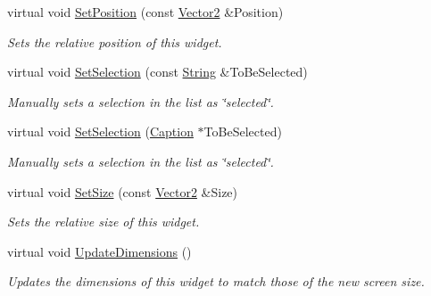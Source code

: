 \begin{DoxyCompactItemize}
virtual void \hyperlink{classMezzanine_1_1UI_1_1DropDownList_a480682783cfaf4ea18b90a058c958ea7}{SetPosition} (const \hyperlink{classMezzanine_1_1Vector2}{Vector2} \&Position)
\begin{DoxyCompactList}\small\item\em Sets the relative position of this widget. \item\end{DoxyCompactList}\item 
virtual void \hyperlink{classMezzanine_1_1UI_1_1DropDownList_ae65a61e7a199b75b80805cbcd6fb979a}{SetSelection} (const \hyperlink{namespaceMezzanine_acf9fcc130e6ebf08e3d8491aebcf1c86}{String} \&ToBeSelected)
\begin{DoxyCompactList}\small\item\em Manually sets a selection in the list as \char`\"{}selected\char`\"{}. \item\end{DoxyCompactList}\item 
virtual void \hyperlink{classMezzanine_1_1UI_1_1DropDownList_aaeb03cbcb2e5a3c5bde4d4f513d70ed8}{SetSelection} (\hyperlink{classMezzanine_1_1UI_1_1Caption}{Caption} $\ast$ToBeSelected)
\begin{DoxyCompactList}\small\item\em Manually sets a selection in the list as \char`\"{}selected\char`\"{}. \item\end{DoxyCompactList}\item 
virtual void \hyperlink{classMezzanine_1_1UI_1_1DropDownList_af9a2fa5e0631162995826326e66108ec}{SetSize} (const \hyperlink{classMezzanine_1_1Vector2}{Vector2} \&Size)
\begin{DoxyCompactList}\small\item\em Sets the relative size of this widget. \item\end{DoxyCompactList}\item 
virtual void \hyperlink{classMezzanine_1_1UI_1_1DropDownList_aeb27e8fc8b99e7c627f53efbddcb4fb3}{UpdateDimensions} ()
\begin{DoxyCompactList}\small\item\em Updates the dimensions of this widget to match those of the new screen size. \item\end{DoxyCompactList}\end{DoxyCompactItemize}
